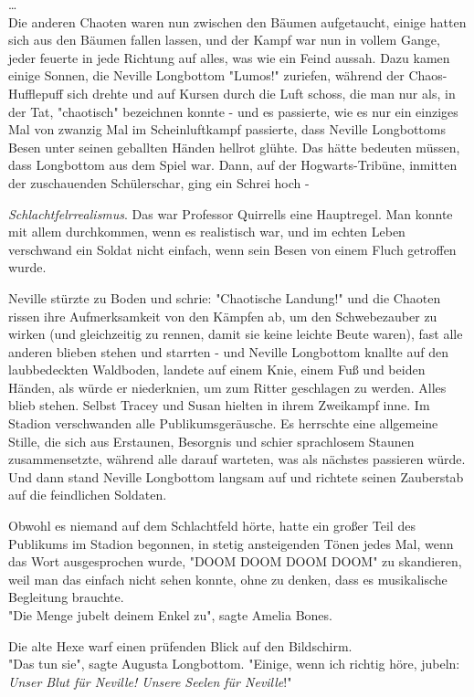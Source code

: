 {…\\ Die anderen Chaoten waren nun zwischen den Bäumen aufgetaucht, einige hatten sich aus den Bäumen fallen lassen, und der Kampf war nun in vollem Gange, jeder feuerte in jede Richtung auf alles, was wie ein Feind aussah. Dazu kamen einige Sonnen, die Neville Longbottom "Lumos!" zuriefen, während der Chaos-Hufflepuff sich drehte und auf Kursen durch die Luft schoss, die man nur als, in der Tat, "chaotisch" bezeichnen konnte - und es passierte, wie es nur ein einziges Mal von zwanzig Mal im Scheinluftkampf passierte, dass Neville Longbottoms Besen unter seinen geballten Händen hellrot glühte. Das hätte bedeuten müssen, dass Longbottom aus dem Spiel war. Dann, auf der Hogwarts-Tribüne, inmitten der zuschauenden Schülerschar, ging ein Schrei hoch -

\emph{Schlachtfelrrealismus}. Das war Professor Quirrells eine Hauptregel. Man konnte mit allem durchkommen, wenn es realistisch war, und im echten Leben verschwand ein Soldat nicht einfach, wenn sein Besen von einem Fluch getroffen wurde.

Neville stürzte zu Boden und schrie: "Chaotische Landung!" und die Chaoten rissen ihre Aufmerksamkeit von den Kämpfen ab, um den Schwebezauber zu wirken (und gleichzeitig zu rennen, damit sie keine leichte Beute waren), fast alle anderen blieben stehen und starrten - und Neville Longbottom knallte auf den laubbedeckten Waldboden, landete auf einem Knie, einem Fuß und beiden Händen, als würde er niederknien, um zum Ritter geschlagen zu werden. Alles blieb stehen. Selbst Tracey und Susan hielten in ihrem Zweikampf inne. Im Stadion verschwanden alle Publikumsgeräusche. Es herrschte eine allgemeine Stille, die sich aus Erstaunen, Besorgnis und schier sprachlosem Staunen zusammensetzte, während alle darauf warteten, was als nächstes passieren würde. Und dann stand Neville Longbottom langsam auf und richtete seinen Zauberstab auf die feindlichen Soldaten.

Obwohl es niemand auf dem Schlachtfeld hörte, hatte ein großer Teil des Publikums im Stadion begonnen, in stetig ansteigenden Tönen jedes Mal, wenn das Wort ausgesprochen wurde, "DOOM DOOM DOOM DOOM" zu skandieren, weil man das einfach nicht sehen konnte, ohne zu denken, dass es musikalische Begleitung brauchte.\\ "Die Menge jubelt deinem Enkel zu", sagte Amelia Bones.

Die alte Hexe warf einen prüfenden Blick auf den Bildschirm.\\ "Das tun sie", sagte Augusta Longbottom. "Einige, wenn ich richtig höre, jubeln: \emph{Unser Blut für Neville! Unsere Seelen für Neville}!"

}
